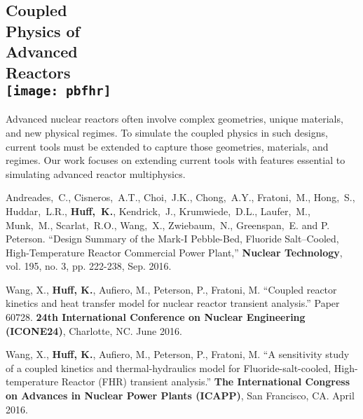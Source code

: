 \documentclass[margin,line]{resume}
\begin{document}
\begin{resume}
        \section{\mysidestyle Coupled\\Physics of\\Advanced\\Reactors\\\vspace{4mm}
        \texttt{[image: pbfhr]}}
Advanced nuclear reactors often involve complex geometries, unique materials,
and new physical regimes. To simulate the coupled physics in such designs,
current tools must be extended to capture those geometries, materials, and
regimes. Our work focuses on extending current tools with features essential to
simulating advanced reactor multiphysics.
        \vspace{2mm}

      \begin{bibenum}
      \item Andreades,~C., Cisneros,~A.T., Choi,~J.K., Chong,~A.Y., 
              Fratoni,~M., Hong,~S., Huddar,~L.R., \textbf{Huff,~K.}, Kendrick,~J., 
              Krumwiede,~D.L., Laufer,~M., Munk,~M., Scarlat,~R.O., Wang,~X., 
              Zwiebaum,~N., Greenspan,~E. and P. Peterson.  ``Design Summary of 
              the Mark-I Pebble-Bed, Fluoride Salt–Cooled, High-Temperature 
              Reactor Commercial Power Plant,'' \textbf{Nuclear Technology}, vol. 195, 
              no. 3, pp. 222-238, Sep. 2016.
      \item Wang, X., \textbf{Huff, K.}, Aufiero, M., Peterson, P., Fratoni, M.
            ``Coupled reactor kinetics and heat transfer model for nuclear 
            reactor transient analysis.'' Paper 60728.  \textbf{24th 
            International Conference on Nuclear Engineering (ICONE24)}, 
            Charlotte, NC.  June 2016. 
      \item Wang, X., \textbf{Huff, K.}, Aufiero, M., Peterson, P., Fratoni, M.
            ``A sensitivity study of a coupled kinetics and thermal-hydraulics 
            model for Fluoride-salt-cooled, High-temperature Reactor (FHR) 
            transient analysis.'' \textbf{The International 
            Congress on Advances in Nuclear Power Plants (ICAPP)}, San 
            Francisco, CA. April 2016.
      \end{bibenum}



\end{resume}
\end{document}
